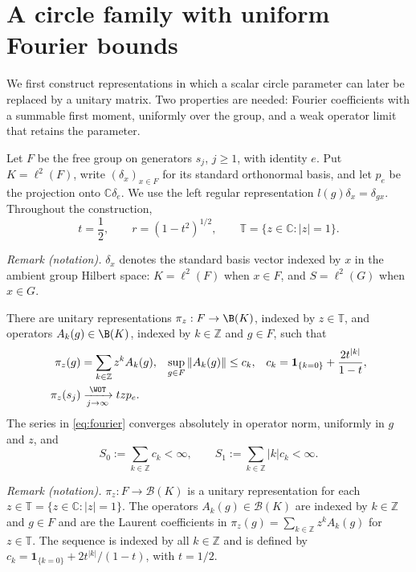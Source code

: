 \section{A circle family with uniform Fourier bounds}\label{sec:circle}

We first construct representations in which a scalar circle parameter can
later be replaced by a unitary matrix. Two properties are needed: Fourier
coefficients with a summable first moment, uniformly over the group, and
a weak operator limit that retains the parameter.

Let $F$ be the free group on generators $s_j$, $j\geq 1$, with identity
$e$. Put $K=\ell^2(F)$, write $(\delta_x)_{x\in F}$ for its standard
orthonormal basis, and let $p_e$ be the projection onto
$\mathbb C\delta_e$. We use the left regular representation
$l(g)\delta_x=\delta_{gx}$. Throughout the construction,
\[
 t=\frac12,\qquad r=(1-t^2)^{1/2},\qquad
 \mathbb T=\{z\in\mathbb C:|z|=1\}.
\]

\noindent\textit{Remark (notation).} $\delta_x$ denotes the standard basis vector indexed by $x$ in the ambient group Hilbert space: $K=\ell^2(F)$ when $x\in F$, and $S=\ell^2(G)$ when $x\in G$.


\begin{proposition}\label{prop:circle}
There are unitary representations $\pi_z:F\to\B(K)$, indexed by
$z\in\mathbb T$, and operators $A_k(g)\in\B(K)$, indexed by
$k\in\mathbb Z$ and $g\in F$, such that
\begin{align}
 \pi_z(g)&=\sum_{k\in\mathbb Z}z^kA_k(g),
 &\sup_{g\in F}\|A_k(g)\|&\leq c_k,
 &c_k&=\mathbf 1_{\{k=0\}}+\frac{2t^{|k|}}{1-t},
 \label{eq:fourier}\\
 \pi_z(s_j)&\xrightarrow[j\to\infty]{\WOT}tzp_e.
 \label{eq:circle-limit}
\end{align}
The series in \eqref{eq:fourier} converges absolutely in operator norm,
uniformly in $g$ and $z$, and
\begin{equation}\label{eq:moments}
 S_0:=\sum_{k\in\mathbb Z}c_k<\infty,
 \qquad S_1:=\sum_{k\in\mathbb Z}|k|c_k<\infty.
\end{equation}
\end{proposition}

\noindent\textit{Remark (notation).} $\pi_z:F\to\mathcal B(K)$ is a unitary representation for each $z\in\mathbb T=\{z\in\mathbb C:|z|=1\}$. The operators $A_k(g)\in\mathcal B(K)$ are indexed by $k\in\mathbb Z$ and $g\in F$ and are the Laurent coefficients in $\pi_z(g)=\sum_{k\in\mathbb Z}z^kA_k(g)$ for $z\in\mathbb T$. The sequence is indexed by all $k\in\mathbb Z$ and is defined by $c_k=\mathbf1_{\{k=0\}}+2t^{|k|}/(1-t)$, with $t=1/2$.


